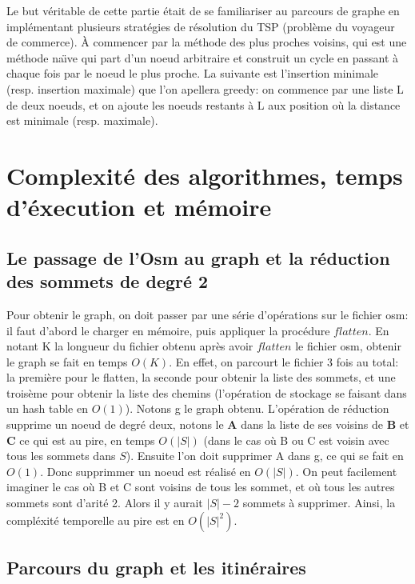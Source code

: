 \documentclass[french]{article}
\begin{document}
Le but véritable de cette partie était de se familiariser au parcours de graphe en implémentant plusieurs stratégies de résolution du TSP (problème du voyageur de commerce). À commencer par la méthode des plus proches voisins, qui est une méthode na\"\i ve qui part d'un noeud arbitraire et construit un cycle en passant à chaque fois par le noeud le plus proche. La suivante est l'insertion minimale (resp. insertion maximale) que l'on apellera greedy: on commence par une liste L de deux noeuds, et on ajoute les noeuds restants à L aux position où la distance est minimale (resp. maximale). \newline

\newpage
\section{Complexité des algorithmes, temps d'éxecution et mémoire}
\subsection{Le passage de l'Osm au graph et la réduction des sommets de degré 2}
Pour obtenir le graph, on doit passer par une série d'opérations sur le fichier osm: il faut d'abord le charger en mémoire, puis appliquer la procédure $flatten$. En notant K la longueur du fichier obtenu après avoir $flatten$ le fichier osm, obtenir le graph se fait en temps $O(K)$. En effet, on parcourt le fichier 3 fois au total: la première pour le flatten, la seconde pour obtenir la liste des sommets, et une troisème pour obtenir la liste des chemins (l'opération de stockage se faisant dans un hash table en $O(1)$).\newline
Notons g le graph obtenu. L'opération de réduction supprime un noeud de degré deux, notons le \textbf{A} dans la liste de ses voisins de \textbf{B} et \textbf{C} ce qui est au pire, en temps $O(\vert S\vert)$ (dans le cas où B ou C est voisin avec tous les sommets dans $S$). Ensuite l'on doit supprimer A dans g, ce qui se fait en $O(1)$. Donc supprimmer un noeud est réalisé en $O(\vert S\vert)$. On peut facilement imaginer le cas où B et C sont voisins de tous les sommet, et où tous les autres sommets sont d'arité 2. Alors il y aurait $\vert S\vert -2$ sommets à supprimer. Ainsi, la compléxité temporelle au pire est en $O(\vert S\vert^2)$.


\subsection{Parcours du graph et les itinéraires} 
\end{document}

